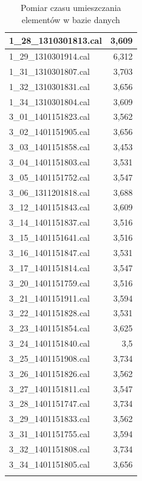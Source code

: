 \begin{longtable}{|l|r|}
    1\_28\_1310301813.cal & 3,609 \\ \hline
    1\_29\_1310301914.cal & 6,312 \\ \hline
    1\_31\_1310301807.cal & 3,703 \\ \hline
    1\_32\_1310301831.cal & 3,656 \\ \hline
    1\_34\_1310301804.cal & 3,609 \\ \hline
    3\_01\_1401151823.cal & 3,562 \\ \hline
    3\_02\_1401151905.cal & 3,656 \\ \hline
    3\_03\_1401151858.cal & 3,453 \\ \hline
    3\_04\_1401151803.cal & 3,531 \\ \hline
    3\_05\_1401151752.cal & 3,547 \\ \hline
    3\_06\_1311201818.cal & 3,688 \\ \hline
    3\_12\_1401151843.cal & 3,609 \\ \hline
    3\_14\_1401151837.cal & 3,516 \\ \hline
    3\_15\_1401151641.cal & 3,516 \\ \hline
    3\_16\_1401151847.cal & 3,531 \\ \hline
    3\_17\_1401151814.cal & 3,547 \\ \hline
    3\_20\_1401151759.cal & 3,516 \\ \hline
    3\_21\_1401151911.cal & 3,594 \\ \hline
    3\_22\_1401151828.cal & 3,531 \\ \hline
    3\_23\_1401151854.cal & 3,625 \\ \hline
    3\_24\_1401151840.cal & 3,5 \\ \hline
    3\_25\_1401151908.cal & 3,734 \\ \hline
    3\_26\_1401151826.cal & 3,562 \\ \hline
    3\_27\_1401151811.cal & 3,547 \\ \hline
    3\_28\_1401151747.cal & 3,734 \\ \hline
    3\_29\_1401151833.cal & 3,562 \\ \hline
    3\_31\_1401151755.cal & 3,594 \\ \hline
    3\_32\_1401151808.cal & 3,734 \\ \hline
    3\_34\_1401151805.cal & 3,656 \\ \hline
    \caption{Pomiar czasu umieszczania elementów w bazie danych}
    \label{tab:insertdb}\\
\end{longtable}
